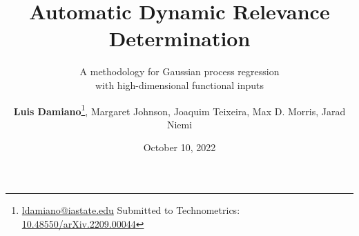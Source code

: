 \documentclass[handout]{snedecorbeamer}
\begin{document}
\title{Automatic Dynamic Relevance Determination}
\subtitle{A methodology for Gaussian process regression\\
  with high-dimensional functional inputs}
\date{October 10, 2022}


\renewcommand*{\thefootnote}{\fnsymbol{footnote}}
\author{
  \textbf{Luis Damiano}\footnote[2]{
    \tiny{\href{mailto:ldamiano@iastate.edu}{ldamiano@iastate.edu}}%
    \newline
    \tiny{Submitted to Technometrics:
      \href{https://doi.org/10.48550/arXiv.2209.00044}{10.48550/arXiv.2209.00044}}
  },
  Margaret Johnson,
  Joaquim Teixeira,
  Max D. Morris,
  Jarad Niemi}

\begin{frame}
  \titlepage{}
\end{frame}
\end{document}
